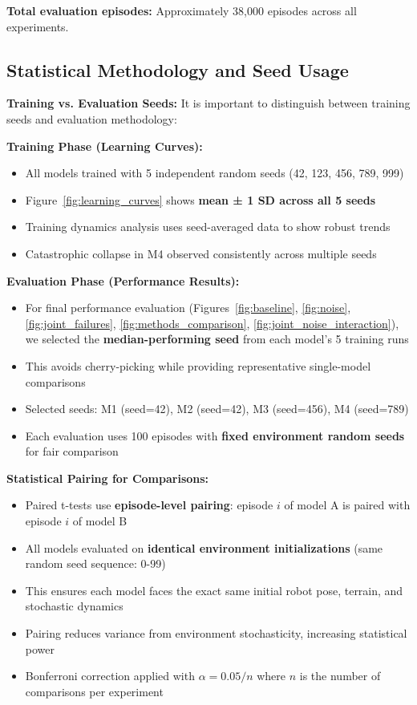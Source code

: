 \documentclass[conference]{IEEEtran}
\begin{document}
\textbf{Total evaluation episodes:} Approximately 38,000 episodes across all experiments.

\subsection{Statistical Methodology and Seed Usage}

\textbf{Training vs. Evaluation Seeds:} It is important to distinguish between training seeds and evaluation methodology:

\textbf{Training Phase (Learning Curves):}
\begin{itemize}
    \item All models trained with 5 independent random seeds (42, 123, 456, 789, 999)
    \item Figure~\ref{fig:learning_curves} shows \textbf{mean ± 1 SD across all 5 seeds}
    \item Training dynamics analysis uses seed-averaged data to show robust trends
    \item Catastrophic collapse in M4 observed consistently across multiple seeds
\end{itemize}

\textbf{Evaluation Phase (Performance Results):}
\begin{itemize}
    \item For final performance evaluation (Figures~\ref{fig:baseline}, \ref{fig:noise}, \ref{fig:joint_failures}, \ref{fig:methods_comparison}, \ref{fig:joint_noise_interaction}), we selected the \textbf{median-performing seed} from each model's 5 training runs
    \item This avoids cherry-picking while providing representative single-model comparisons
    \item Selected seeds: M1 (seed=42), M2 (seed=42), M3 (seed=456), M4 (seed=789)
    \item Each evaluation uses 100 episodes with \textbf{fixed environment random seeds} for fair comparison
\end{itemize}

\textbf{Statistical Pairing for Comparisons:}
\begin{itemize}
    \item Paired t-tests use \textbf{episode-level pairing}: episode $i$ of model A is paired with episode $i$ of model B
    \item All models evaluated on \textbf{identical environment initializations} (same random seed sequence: 0-99)
    \item This ensures each model faces the exact same initial robot pose, terrain, and stochastic dynamics
    \item Pairing reduces variance from environment stochasticity, increasing statistical power
    \item Bonferroni correction applied with $\alpha = 0.05/n$ where $n$ is the number of comparisons per experiment
\end{itemize}
\end{document}
